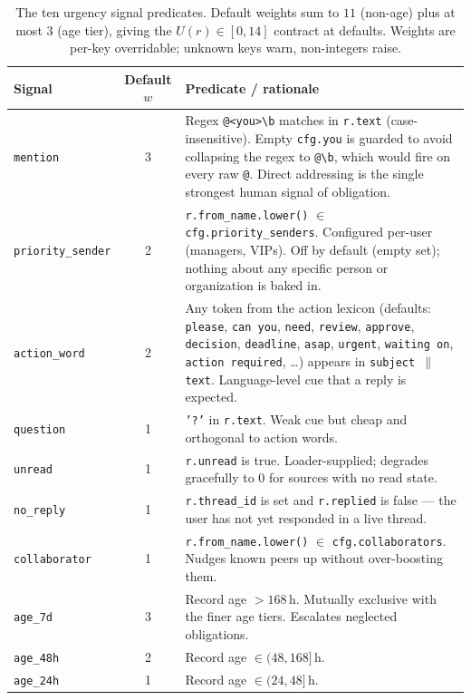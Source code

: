 \begin{table}[t]
\centering
\small
\caption{The ten urgency signal predicates. Default weights sum to
$11$ (non-age) plus at most $3$ (age tier), giving the
$U(r) \in [0, 14]$ contract at defaults. Weights are per-key
overridable; unknown keys warn, non-integers raise.}
\label{tab:signals}
\begin{tabular}{lcp{9.2cm}}
\toprule
\textbf{Signal} & \textbf{Default $w$} & \textbf{Predicate / rationale} \\
\midrule
\texttt{mention}         & 3 & Regex \verb|@<you>\b| matches in \texttt{r.text} (case-insensitive). Empty \texttt{cfg.you} is guarded to avoid collapsing the regex to \verb|@\b|, which would fire on every raw \texttt{@}. Direct addressing is the single strongest human signal of obligation. \\
\texttt{priority\_sender} & 2 & \texttt{r.from\_name.lower()} $\in$ \texttt{cfg.priority\_senders}. Configured per-user (managers, VIPs). Off by default (empty set); nothing about any specific person or organization is baked in. \\
\texttt{action\_word}    & 2 & Any token from the action lexicon (defaults: \texttt{please}, \texttt{can you}, \texttt{need}, \texttt{review}, \texttt{approve}, \texttt{decision}, \texttt{deadline}, \texttt{asap}, \texttt{urgent}, \texttt{waiting on}, \texttt{action required}, \dots) appears in \texttt{subject $\|$ text}. Language-level cue that a reply is expected. \\
\texttt{question}        & 1 & \texttt{'?'} in \texttt{r.text}. Weak cue but cheap and orthogonal to action words. \\
\texttt{unread}          & 1 & \texttt{r.unread} is true. Loader-supplied; degrades gracefully to $0$ for sources with no read state. \\
\texttt{no\_reply}       & 1 & \texttt{r.thread\_id} is set and \texttt{r.replied} is false --- the user has not yet responded in a live thread. \\
\texttt{collaborator}    & 1 & \texttt{r.from\_name.lower()} $\in$ \texttt{cfg.collaborators}. Nudges known peers up without over-boosting them. \\
\texttt{age\_7d}         & 3 & Record age $> 168$\,h. Mutually exclusive with the finer age tiers. Escalates neglected obligations. \\
\texttt{age\_48h}        & 2 & Record age $\in (48, 168]$\,h. \\
\texttt{age\_24h}        & 1 & Record age $\in (24, 48]$\,h. \\
\bottomrule
\end{tabular}
\end{table}

